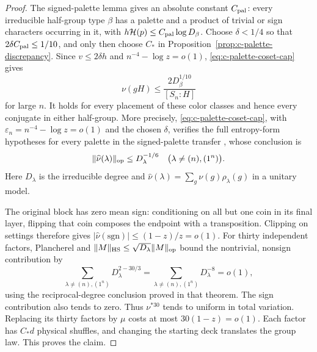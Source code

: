 \begin{proof}
The signed-palette lemma
\cite[Lemma~\ref*{l-l:signed-palette}]{partialFourier} gives an absolute
constant $C_{\rm pal}$: every irreducible half-group type $\beta$ has a
palette and a product of trivial or sign characters occurring in it,
with $h\mathcal H(p)\le C_{\rm pal}\log D_\beta$.
Choose $\delta<1/4$ so that $2\delta C_{\rm pal}\le1/10$, and only
then choose $C_*$ in Proposition~\ref{prop:c-palette-discrepancy}.
Since $v\le2\delta h$ and $n^{-4}-\log z=o(1)$,
\eqref{eq:c-palette-coset-cap} gives
\[
 \nu(gH)\le \frac{2D_\beta^{1/10}}{[S_n:H]}
\]
for large $n$.  It holds for every placement of these color classes
and hence every conjugate in either half-group.  More precisely,
\eqref{eq:c-palette-coset-cap}, with
$\varepsilon_n=n^{-4}-\log z=o(1)$ and the chosen $\delta$, verifies
the full entropy-form hypotheses for every palette in the signed-palette
transfer \cite[Theorem~\ref*{l-l:palette-transfer}]{partialFourier}, whose
conclusion is
\[
 \|\widehat\nu(\lambda)\|_{\rm op}\le D_\lambda^{-1/6}
 \quad\bigl(\lambda\ne(n),(1^n)\bigr).
\]
Here $D_\lambda$ is the irreducible degree and
$\widehat\nu(\lambda)=\sum_g\nu(g)\rho_\lambda(g)$ in a unitary model.

The original block has zero mean sign: conditioning on all but one
coin in its final layer, flipping that coin composes the endpoint with
a transposition.  Clipping on settings therefore gives
$|\widehat\nu(\mathrm{sgn})|\le(1-z)/z=o(1)$.
For thirty independent factors, Plancherel and
$\|M\|_{\rm HS}\le\sqrt{D_\lambda}\|M\|_{\rm op}$ bound the
nontrivial, nonsign contribution by
\[
 \sum_{\lambda\ne(n),(1^n)}D_\lambda^{2-30/3}
 =\sum_{\lambda\ne(n),(1^n)}D_\lambda^{-8}=o(1),
\]
using the reciprocal-degree conclusion proved in that theorem.  The sign contribution
also tends to zero.  Thus $\nu^{*30}$ tends to uniform in total
variation.  Replacing its thirty factors by $\mu$ costs at most
$30(1-z)=o(1)$.  Each factor has $C_*d$ physical shuffles, and changing
the starting deck translates the group law.  This proves the claim.
\end{proof}
